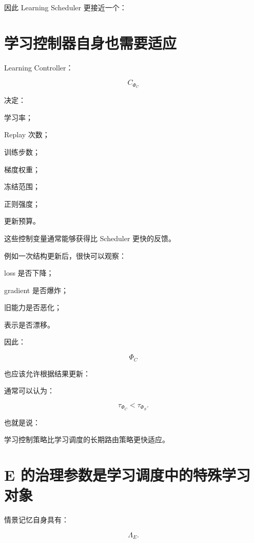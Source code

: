因此 Learning Scheduler 更接近一个：

\begin{statementbox}
\centering
{}
\end{statementbox}


\section{学习控制器自身也需要适应}

Learning Controller：

\[
C_{\Phi_C}
\]

决定：

学习率；

Replay 次数；

训练步数；

梯度权重；

冻结范围；

正则强度；

更新预算。

这些控制变量通常能够获得比 Scheduler 更快的反馈。

例如一次结构更新后，很快可以观察：

loss 是否下降；

gradient 是否爆炸；

旧能力是否恶化；

表示是否漂移。

因此：

\[
\boxed{
\Phi_C
}
\]

也应该允许根据结果更新：

\begin{statementbox}
\centering
{}
\end{statementbox}

通常可以认为：

\[
\boxed{
\tau_{\Phi_C}
<
\tau_{\Phi_S}.
}
\]

也就是说：

学习控制策略比学习调度的长期路由策略更快适应。


\section{E 的治理参数是学习调度中的特殊学习对象}

情景记忆自身具有：

\[
\Lambda_E.
\]

